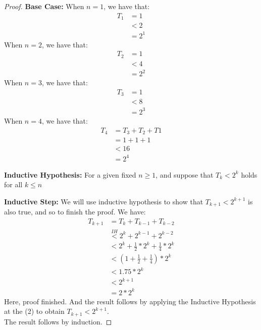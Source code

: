 \documentclass[11pt]{article}
\theoremstyle{definition}
\theoremstyle{definition}
\theoremstyle{definition}
\begin{document}
\begin{proof}
\item \textbf{Base Case:} When $n = 1$, we have that:
\begin{align*}
T_{1} &= 1	\\
&<2	\\
&= 2^{1}
\end{align*}
 When $n = 2$, we have that:
\begin{align*}
T_{2} &= 1	\\
&<4	\\
&= 2^{2}
\end{align*}
 When $n = 3$, we have that:
\begin{align*}
T_{3} &= 1	\\
&<8	\\
&= 2^{3}
\end{align*}
 When $n = 4$, we have that:
\begin{align*}
T_{4} &= T_{3}+T_{2}+T{1}	\\
&=1+1+1\\
&<16	\\
&= 2^{4}
\end{align*}
\item \textbf{Inductive Hypothesis:} For a given fixed $n \geq 1$, and suppose that  $T_{k} < 2^k$ holds for all $k\leq n$\\
\item \textbf{Inductive Step:} We will use inductive hypothesis to show that $T_{k+1} < 2^{k+1}$ is also true, and so to finish the proof. We have:
\begin{align}
T_{k+1} &= T_{k} + T_{k-1} + T_{k-2} \\
	   &\stackrel{IH}{<} 2^{k} + 2^{k-1} + 2^{k-2} \\
	   &< 2^k+\frac{1}{2} * 2^k+ \frac{1}{4}*2^k\\
	   &< (1 + \frac{1}{2}+\frac{1}{4})*2^k 	\\
	   &< 1.75 * 2^k 	\\
	   &< 2^{k+1} 		\\
	   &= 2 * 2^k
\end{align}
Here, proof finished. And the result follows by applying the Inductive Hypothesis at the (2) to obtain $T_{k+1} < 2^{k+1}$.\\
The result follows by induction.
\end{proof}



\newpage
\end{document}
